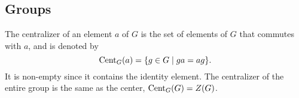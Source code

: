 \subsection{Groups}

\cite{DummitFoote}

%

\begin{definition}[Centralizer]
	The centralizer of an element $a$ of $G$ is the set of elements of $G$ that commutes with $a$, and is denoted by 
	\[
	\text{Cent}_G(a) = \{ g \in G \mid ga = ag \}.
	\]
	It is non-empty since it contains the identity element. The centralizer of the entire group is the same as the center, $\text{Cent}_G(G) = Z(G)$.
\end{definition}

